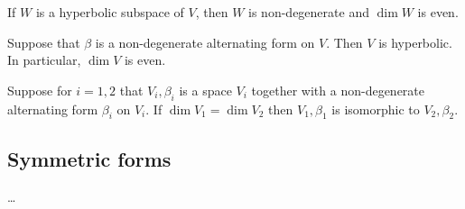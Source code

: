 \documentclass[11pt]{article}
\numberwithin{equation}{section}
\begin{document}
\begin{lemma}
If \(W\) is a hyperbolic subspace of \(V\), then \(W\) is
non-degenerate and \(\dim W\) is even.
\label{lemma:hyperbolic-even-dimensional}
\end{lemma}

\begin{theorem}
Suppose that \(\beta\) is a non-degenerate alternating form on
\(V\). Then \(V\) is hyperbolic. In particular, \(\dim V\) is even. 
\label{theorem:alternating-forms-are-hyperbolic}
\end{theorem}

\begin{corollary}
Suppose for \(i=1,2\) that \(V_i,\beta_i\) is a space \(V_i\) together
with a non-degenerate alternating form \(\beta_i\) on \(V_i\).
If \(\dim V_1 = \dim V_2\) then \(V_1,\beta_1\) is isomorphic to
\(V_2,\beta_2\).
\label{corollary:alternating-forms-classified}
\end{corollary}
\subsection{Symmetric forms}
\label{sec:symmetric-forms}
\ldots{}
\end{document}
